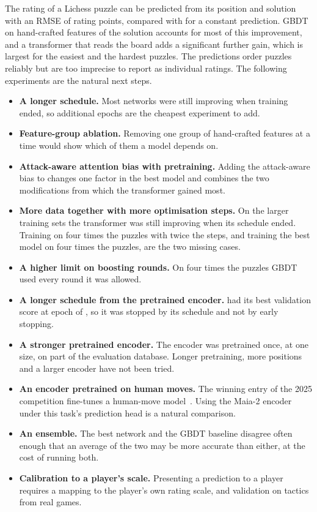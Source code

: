 \documentclass[11pt]{article}
\begin{document}
The rating of a Lichess puzzle can be predicted from its position and
solution with an RMSE of  rating points, compared with
 for a constant prediction. GBDT on hand-crafted features of
the solution accounts for most of this improvement, and a transformer that
reads the board adds a significant further gain, which is largest for the
easiest and the hardest puzzles. The predictions order puzzles reliably but
are too imprecise to report as individual ratings. The following experiments
are the natural next steps.
\begin{itemize}
\ifchangeepochs\else
\item \textbf{A longer schedule.} Most networks were still improving when
training ended, so additional epochs are the cheapest experiment to add.
\fi
\iffeatures\else
\item \textbf{Feature-group ablation.} Removing one group of hand-crafted
features at a time would show which of them a model depends on.
\fi
\ifchangeattacks\ifchangestart
\item \textbf{Attack-aware attention bias with pretraining.} Adding the
attack-aware bias to  changes one
factor in the best model and combines the two modifications from which the
transformer gained most.
\fi\fi
\ifmore
\item \textbf{More data together with more optimisation steps.} On the
larger training sets the transformer was still improving when its schedule
ended. Training on four times the puzzles with twice the steps, and
training the best model on four times the puzzles, are the two missing
cases.
\item \textbf{A higher limit on boosting rounds.} On four times the puzzles
GBDT used every round it was allowed.
\fi
\ifchangestart
\item \textbf{A longer schedule from the pretrained encoder.}
 had its best validation score at
epoch  of
, so it was stopped by its
schedule and not by early stopping.
\item \textbf{A stronger pretrained encoder.} The encoder was pretrained
once, at one size, on part of the evaluation database. Longer pretraining,
more positions and a larger encoder have not been tried.
\fi
\item \textbf{An encoder pretrained on human moves.} The winning entry of
the 2025 competition fine-tunes a human-move
model~\cite{puzzlecupwinner}. Using the Maia-2 encoder under this task's
prediction head is a natural comparison.
\item \textbf{An ensemble.} The best network and the GBDT baseline disagree
often enough that an average of the two may be more accurate than either, at
the cost of running both.
\item \textbf{Calibration to a player's scale.} Presenting a prediction to a
player requires a mapping to the player's own rating scale, and validation
on tactics from real games.
\end{itemize}
\end{document}
